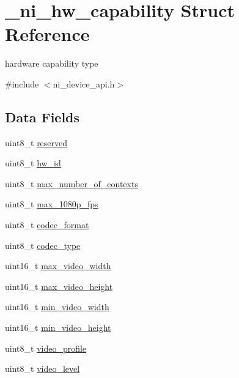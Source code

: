 \hypertarget{struct__ni__hw__capability}{}\section{\+\_\+ni\+\_\+hw\+\_\+capability Struct Reference}
\label{struct__ni__hw__capability}


hardware capability type  




{\ttfamily \#include $<$ni\+\_\+device\+\_\+api.\+h$>$}

\subsection*{Data Fields}
\begin{DoxyCompactItemize}
\item 
uint8\+\_\+t \mbox{\hyperlink{struct__ni__hw__capability_acb7bc06bed6f6408d719334fc41698c7}{reserved}}
\item 
uint8\+\_\+t \mbox{\hyperlink{struct__ni__hw__capability_a93124d2e13be33bebf0974c52bcf4a95}{hw\+\_\+id}}
\item 
uint8\+\_\+t \mbox{\hyperlink{struct__ni__hw__capability_a680787066b818b6a92b9fa6c34c81911}{max\+\_\+number\+\_\+of\+\_\+contexts}}
\item 
uint8\+\_\+t \mbox{\hyperlink{struct__ni__hw__capability_a84afe71dea96edf2c430257e6b1d3d73}{max\+\_\+1080p\+\_\+fps}}
\item 
uint8\+\_\+t \mbox{\hyperlink{struct__ni__hw__capability_a4b58a392a239233c112224c5c6b67b69}{codec\+\_\+format}}
\item 
uint8\+\_\+t \mbox{\hyperlink{struct__ni__hw__capability_a5b16cde76ddd2d653b1c6968e015038d}{codec\+\_\+type}}
\item 
uint16\+\_\+t \mbox{\hyperlink{struct__ni__hw__capability_ab81ecded1f7c46e120c8f2afa7b2c5cc}{max\+\_\+video\+\_\+width}}
\item 
uint16\+\_\+t \mbox{\hyperlink{struct__ni__hw__capability_a4fef4b2fa1a8ae8446314ad0af4ce698}{max\+\_\+video\+\_\+height}}
\item 
uint16\+\_\+t \mbox{\hyperlink{struct__ni__hw__capability_a9538e1d5ae4f9ff8d36300cbb4c00b17}{min\+\_\+video\+\_\+width}}
\item 
uint16\+\_\+t \mbox{\hyperlink{struct__ni__hw__capability_a43f975508191b1d0d9744ed1e732c027}{min\+\_\+video\+\_\+height}}
\item 
uint8\+\_\+t \mbox{\hyperlink{struct__ni__hw__capability_a6ac0df93e34a92f42f95c483556d0822}{video\+\_\+profile}}
\item 
uint8\+\_\+t \mbox{\hyperlink{struct__ni__hw__capability_a4b623f3cc710f9e3edb7da7aee734242}{video\+\_\+level}}
\end{DoxyCompactItemize}


